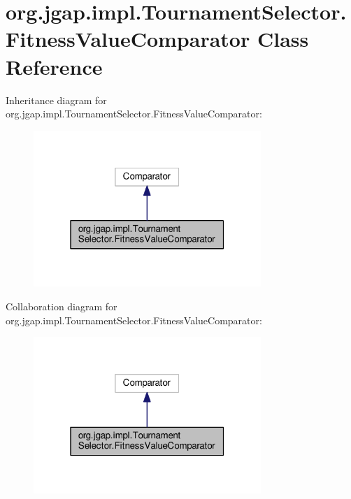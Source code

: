 \hypertarget{classorg_1_1jgap_1_1impl_1_1_tournament_selector_1_1_fitness_value_comparator}{\section{org.\-jgap.\-impl.\-Tournament\-Selector.\-Fitness\-Value\-Comparator Class Reference}
\label{classorg_1_1jgap_1_1impl_1_1_tournament_selector_1_1_fitness_value_comparator}
}


Inheritance diagram for org.\-jgap.\-impl.\-Tournament\-Selector.\-Fitness\-Value\-Comparator\-:
\nopagebreak
\begin{figure}[H]
\begin{center}
\leavevmode
\includegraphics[width=244pt]{classorg_1_1jgap_1_1impl_1_1_tournament_selector_1_1_fitness_value_comparator__inherit__graph}
\end{center}
\end{figure}


Collaboration diagram for org.\-jgap.\-impl.\-Tournament\-Selector.\-Fitness\-Value\-Comparator\-:
\nopagebreak
\begin{figure}[H]
\begin{center}
\leavevmode
\includegraphics[width=244pt]{classorg_1_1jgap_1_1impl_1_1_tournament_selector_1_1_fitness_value_comparator__coll__graph}
\end{center}
\end{figure}
